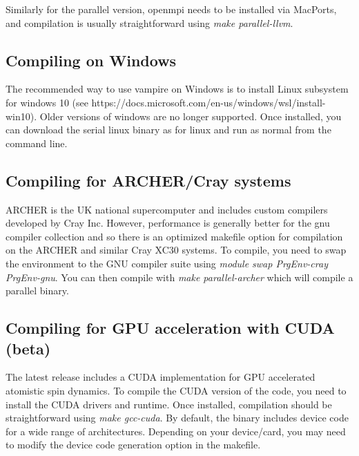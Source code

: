 Similarly for the parallel version, openmpi needs to be installed via MacPorts, and compilation is usually straightforward using \textit{make parallel-llvm}.

\subsection*{Compiling on Windows}
The recommended way to use vampire on Windows is to install Linux subsystem for windows 10 (see https://docs.microsoft.com/en-us/windows/wsl/install-win10). Older versions of windows are no longer supported. Once installed, you can download the serial linux binary as for linux and run as normal from the command line.



\subsection*{Compiling for ARCHER/Cray systems}
ARCHER is the UK national supercomputer and includes custom compilers developed by Cray Inc. However, performance is generally better for the gnu compiler collection and so there is an optimized makefile option for compilation on the ARCHER and similar Cray XC30 systems. To compile, you need to swap the environment to the GNU compiler suite using \textit{module swap PrgEnv-cray PrgEnv-gnu}. You can then compile with \textit{make parallel-archer} which will compile a parallel binary.

\subsection*{Compiling for GPU acceleration with CUDA (beta)}
The latest release includes a CUDA implementation for GPU accelerated atomistic spin dynamics. To compile the CUDA version of the code, you need to install the CUDA drivers and runtime. Once installed, compilation should be straightforward using \textit{make gcc-cuda}. By default, the binary includes device code for a wide range of architectures. Depending on your device/card, you may need to modify the device code generation option in the makefile.

